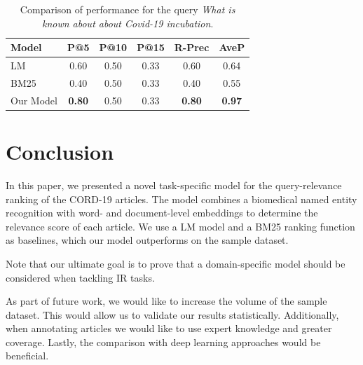 \documentclass[10pt, a4paper]{article}
\begin{document}
	\begin{table}
		\caption{Comparison of performance for the query \textit{What is known about about Covid-19 incubation}.}
		\label{tab:query2}
		\begin{center}
			\begin{tabular}{lccccc}
				\toprule
				Model & P@5 & P@10 & P@15 & R-Prec & AveP \\
				\midrule
				LM & 0.60 & 0.50 & 0.33 & 0.60 & 0.64 \\
				BM25 & 0.40 & 0.50 & 0.33 & 0.40 & 0.55 \\
				Our Model & \textbf{0.80} & 0.50 & 0.33 & \textbf{0.80} & \textbf{0.97} \\
				\bottomrule
			\end{tabular}
		\end{center}
	\end{table}
	
	\section{Conclusion}
	
	In this paper, we presented a novel task-specific model for the query-relevance ranking of the CORD-19 articles. The model combines a biomedical named entity recognition with word- and document-level embeddings to determine the relevance score of each article. We use a LM model and a BM25 ranking function as baselines, which our model outperforms on the sample dataset.
	
	Note that our ultimate goal is to prove that a domain-specific model should be considered when tackling IR tasks.
	
	As part of future work, we would like to increase the volume of the sample dataset. This would allow us to validate our results statistically. Additionally, when annotating articles we would like to use expert knowledge and greater coverage. Lastly, the comparison with deep learning approaches would be beneficial.
	



\end{document}
